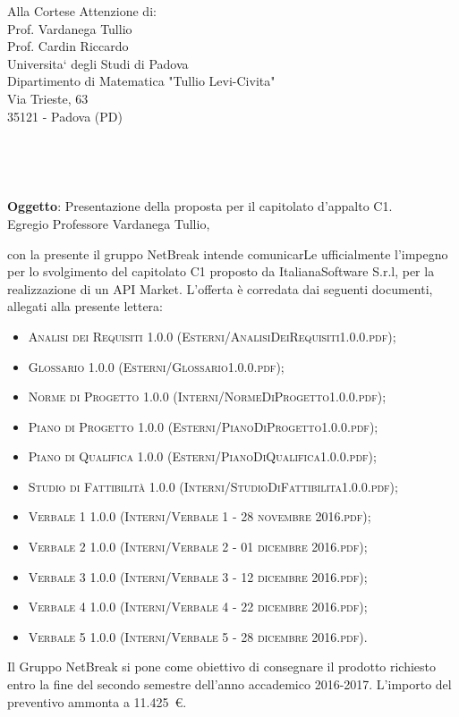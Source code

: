 \documentclass[11pt,a4paper]{letter}
\def\opening#1{\thispagestyle{empty}
{\centering\fromaddress \vspace{0.6in} \\ %
\hspace*{\longindentation}\hspace*{\fill}\par} %
{\raggedright \toname \\ \toaddress \par} %
\vspace{0.1in} %
\noindent #1 %
}
\begin{document}

\begin{letter}
{Alla Cortese Attenzione di:\\
	Prof. Vardanega Tullio\\
	Prof. Cardin Riccardo\\
	Universita` degli Studi di Padova\\
	Dipartimento di Matematica "Tullio Levi-Civita"\\
	Via Trieste, 63\\
	35121 - Padova (PD)\\
}



\opening {\textbf{Oggetto}: Presentazione della proposta per il capitolato d'appalto C1.}\\

\noindent Egregio Professore Vardanega Tullio,

\indent con la presente il gruppo NetBreak intende comunicarLe ufficialmente l'impegno per lo svolgimento del capitolato C1 proposto da ItalianaSoftware S.r.l, per la realizzazione di un API Market.
L'offerta \`e corredata dai seguenti documenti, allegati alla presente lettera:
\begin{itemize}
	\item \textsc{Analisi dei Requisiti 1.0.0 (Esterni/AnalisiDeiRequisiti1.0.0.pdf)}; 
	\item \textsc{Glossario 1.0.0 (Esterni/Glossario1.0.0.pdf)}; 
	\item \textsc{Norme di Progetto 1.0.0 (Interni/NormeDiProgetto1.0.0.pdf)}; 
	\item \textsc{Piano di Progetto 1.0.0 (Esterni/PianoDiProgetto1.0.0.pdf)}; 
	\item \textsc{Piano di Qualifica 1.0.0 (Esterni/PianoDiQualifica1.0.0.pdf)}; 
	\item \textsc{Studio di Fattibilit\`a 1.0.0 (Interni/StudioDiFattibilita1.0.0.pdf)}; 
	\item \textsc{Verbale 1 1.0.0 (Interni/Verbale 1 - 28 novembre 2016.pdf)}; 
	\item \textsc{Verbale 2 1.0.0 (Interni/Verbale 2 - 01 dicembre 2016.pdf)}; 
	\item \textsc{Verbale 3 1.0.0 (Interni/Verbale 3 - 12 dicembre 2016.pdf)}; 
	\item \textsc{Verbale 4 1.0.0 (Interni/Verbale 4 - 22 dicembre 2016.pdf)}; 
	\item \textsc{Verbale 5 1.0.0 (Interni/Verbale 5 - 28 dicembre 2016.pdf)}. 
\end{itemize}
	Il Gruppo NetBreak si pone come obiettivo di consegnare il prodotto richiesto entro la fine del secondo semestre dell'anno accademico 2016-2017. L'importo del preventivo ammonta a \hbox{11.425 \euro{}.}


\end{letter}
\end{document}
